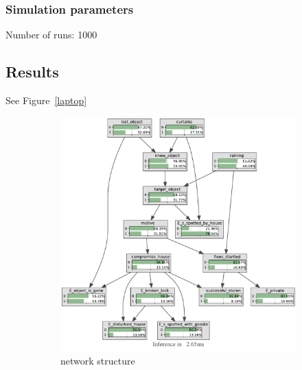 \subsubsection{Simulation parameters}
Number of runs: 1000




\subsection{Results}

See Figure~\ref{laptop}


\begin{figure}[h]
\begin{center}
\begin{subfigure}{.7\textwidth}
\includegraphics[width=\linewidth]{../experiments/StolenLaptop/bnImage/BNIMAGEStolenLaptop.pdf}
\caption{network structure}
\label{laptopAcc}
\end{subfigure}
\end{center}

\begin{subfigure}{.5\textwidth}


\end{subfigure}
\end{figure}

